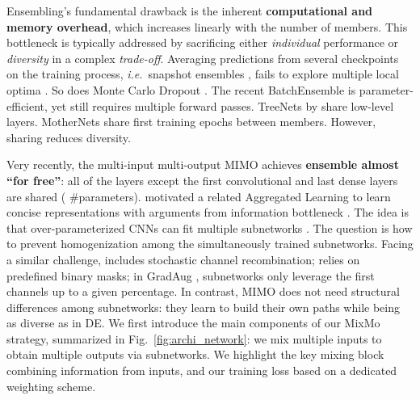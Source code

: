 \documentclass[10pt,twocolumn,letterpaper]{article}
\begin{document}
Ensembling's fundamental drawback is the inherent \textbf{computational and memory overhead}, which
increases linearly with the number of members. This bottleneck is typically addressed by sacrificing either \textit{individual} performance or \textit{diversity} in a complex \textit{trade-off}. Averaging predictions from several checkpoints on the training process, \textit{i.e.}\ snapshot ensembles \cite{garipov2018loss,huang2017snapshot,izmailov2018averaging,maddox2019simple,ritter2018scalable}, fails to explore multiple local optima \cite{ashukha2020pitfalls,fort2019deep,wilson2020bayesian}. So does Monte Carlo Dropout \cite{gal2016dropout}. The recent BatchEnsemble
\cite{dusenberry2020efficient}
is parameter-efficient, yet still requires multiple forward passes.
TreeNets \cite{lee2015m,szegedy2015going} by share low-level layers. MotherNets \cite{wasay2018othernets} share first training epochs between members.
However, sharing reduces diversity.




Very recently, the multi-input multi-output MIMO \cite{havasi2020raining} achieves \textbf{ensemble almost ``for free''}: all of the layers except the first convolutional and last dense layers are shared ( \#parameters). \cite{soflaei2020aggregated} motivated a related Aggregated Learning to learn concise representations with arguments from information bottleneck \cite{alemi2016deep,tishby2000information}. The idea is that over-parameterized CNNs \cite{lottery2019,molchanov2016pruning,pensia2020ptimal} can fit multiple subnetworks \cite{veit2016residual}. The question is how to prevent homogenization among the simultaneously trained subnetworks.
Facing a similar challenge, \cite{gao2019ntraensemble} includes stochastic channel
recombination; \cite{durasov2020asksembles} relies on predefined binary masks; in GradAug \cite{yang2020radaug}, subnetworks only leverage the first channels up to a given percentage. In contrast, MIMO does not need structural differences among subnetworks: they learn to build their own paths while being as diverse as in DE.%
We first introduce the main components of our MixMo strategy, summarized in Fig.~\ref{fig:archi_network}: we mix multiple inputs to obtain multiple outputs via subnetworks.
We highlight the key mixing block combining information from inputs, and our training loss based on a dedicated weighting scheme.
\end{document}
